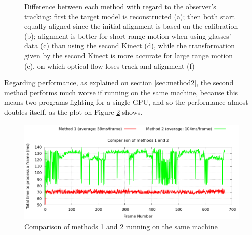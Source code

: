 \documentclass[msc, a4paper, classic, en]{ufbathesis}
\begin{document}
\begin{figure}
\centering
{}
\caption{Difference between each method with regard to the observer's tracking: first the target model is reconstructed (a); then both start equally aligned since the initial alignment is based on the calibration (b); alignment is better for short range motion when using glasses' data (c) than using the second Kinect (d), while the transformation given by the second Kinect is more accurate for large range motion (e), on which optical flow loses track and alignment (f)}
\label{fig:diff}
\end{figure}

Regarding performance, as explained on section \ref{sec:method2}, the second method performs much worse if running on the same machine, because this means two programs fighting for a single GPU, and so the performance almost doubles itself, as the plot on Figure \ref{fig:perf} shows.

\begin{figure}
\centering
\includegraphics[width=1\textwidth]{images/plot2.png}
\caption{Comparison of methods 1 and 2 running on the same machine}
\label{fig:perf}
\end{figure}
\end{document}
